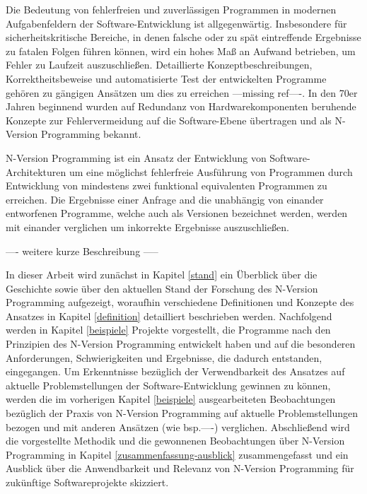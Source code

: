 Die Bedeutung von fehlerfreien und zuverlässigen Programmen in modernen Aufgabenfeldern der Software-Entwicklung ist allgegenwärtig.
Insbesondere für sicherheitskritische Bereiche, in denen falsche oder zu spät eintreffende Ergebnisse zu fatalen Folgen führen können, wird ein hohes Maß an Aufwand betrieben, um Fehler zu Laufzeit auszuschließen.
Detaillierte Konzeptbeschreibungen, Korrektheitsbeweise und automatisierte Test der entwickelten Programme gehören zu gängigen Ansätzen um dies zu erreichen ---missing ref----.
In den 70er Jahren beginnend wurden auf Redundanz von Hardwarekomponenten beruhende Konzepte zur Fehlervermeidung auf die Software-Ebene übertragen und als N-Version Programming bekannt.



N-Version Programming ist ein Ansatz der Entwicklung von Software-Architekturen um eine möglichst fehlerfreie Ausführung von Programmen durch Entwicklung von mindestens zwei funktional equivalenten Programmen zu erreichen.
Die Ergebnisse einer Anfrage and die unabhängig von einander entworfenen Programme, welche auch als Versionen bezeichnet werden, werden mit einander verglichen um inkorrekte Ergebnisse auszuschließen.

---- weitere kurze Beschreibung -----


In dieser Arbeit wird zunächst in Kapitel \ref{stand} ein Überblick über die Geschichte sowie über den aktuellen Stand der Forschung des N-Version Programming aufgezeigt, woraufhin verschiedene Definitionen und Konzepte des Ansatzes in Kapitel \ref{definition} detailliert beschrieben werden. Nachfolgend werden in Kapitel \ref{beispiele} Projekte vorgestellt, die Programme nach den Prinzipien des N-Version Programming entwickelt haben und auf die besonderen Anforderungen, Schwierigkeiten und Ergebnisse, die dadurch entstanden, eingegangen.
Um Erkenntnisse bezüglich der Verwendbarkeit des Ansatzes auf aktuelle Problemstellungen der Software-Entwicklung gewinnen zu können, werden die im vorherigen Kapitel \ref{beispiele} ausgearbeiteten Beobachtungen bezüglich der Praxis von N-Version Programming auf aktuelle Problemstellungen bezogen und mit anderen Ansätzen (wie bsp.----) verglichen.
Abschließend wird die vorgestellte Methodik und die gewonnenen Beobachtungen über N-Version Programming in Kapitel \ref{zusammenfassung-ausblick} zusammengefasst und ein Ausblick über die Anwendbarkeit und Relevanz von N-Version Programming für zukünftige Softwareprojekte skizziert.